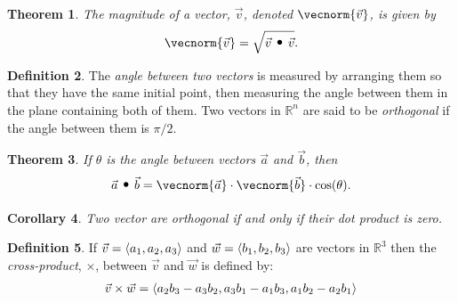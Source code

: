 \documentclass{article}[11pt]
\newtheorem{theorem}{Theorem}[section]
\newtheorem{corollary}[theorem]{Corollary}
\theoremstyle{definition}
\newtheorem{definition}[theorem]{Definition}
\DeclareMathOperator*{\dotprod}{\scalerel*{\cdot}{\bigodot}}
\DeclarePairedDelimiter\vecvec{\langle}{\rangle}
\numberwithin{equation}{section}
\begin{document}
\begin{theorem}
	The magnitude of a vector, \(\vec{v}\), denoted \(\vecnorm{\vec{v}}\), is given by
	\begin{align*}
		\vecnorm{\vec{v}} = \sqrt{ \vec{v}\dotprod\vec{v} }.
	\end{align*}
\end{theorem}

\begin{definition}
	The \emph{angle between two vectors} is measured by arranging them so that they have the same initial point, then measuring the angle between them in the plane containing both of them. Two vectors in \(\mathbb{R}^n\) are said to be \emph{orthogonal} if the angle between them is \( \pi/2 \).
\end{definition}

\begin{theorem}
	If \( \theta \) is the angle between vectors \(\vec{a}\) and \(\vec{b}\), then 
	\begin{align*}
		\vec{a}\dotprod\vec{b}=\vecnorm{\vec{a}}\cdot\vecnorm{\vec{b}}\cdot\cos(\theta).
	\end{align*}
\end{theorem}

\begin{corollary}
	Two vector are orthogonal if and only if their dot product is zero.
\end{corollary}

\begin{definition}
	If \(\vec{v}=\vecvec{a_1,a_2,a_3}\) and \(\vec{w}=\vecvec{b_1,b_2,b_3}\) are vectors in \(\mathbb{R}^3\) then the \emph{cross-product}, \(\times\), between \(\vec{v}\) and \(\vec{w}\) is defined by:
	\begin{align*}
		\vec{v} \times \vec{w} = \vecvec{a_2b_3-a_3b_2, a_3b_1-a_1b_3, a_1b_2-a_2b_1}
	\end{align*}
\end{definition}
\end{document}

